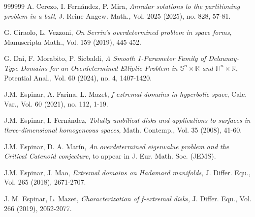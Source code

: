 \documentclass[11pt]{article}
\numberwithin{equation} {section}
\begin{document}
\begin{thebibliography}{999999}
	 A. Cerezo, I. Fernández, P. Mira, \emph{Annular solutions to the partitioning problem in a ball}, J. Reine Angew. Math., Vol. 2025 (2025), no. 828, 57-81.

	
	
	 G. Ciraolo, L. Vezzoni, {\it On Serrin's overdetermined problem in space forms}, Manuscripta Math., Vol. 159 (2019), 445-452. 
	
	 G. Dai, F. Morabito, P. Sicbaldi, \emph{A Smooth 1-Parameter Family of Delaunay-Type Domains for an Overdetermined Elliptic Problem in $\mathbb{S}^n \times \mathbb{R}$ and $\mathbb{H}^n \times \mathbb{R}$}, Potential Anal., Vol. 60 (2024), no. 4, 1407-1420.
	
	
	
	
	 J.M. Espinar, A. Farina, L. Mazet, \emph{f-extremal domains in hyperbolic space}, Calc. Var., Vol. 60 (2021), no. 112, 1-19. 
	
	 J.M. Espinar, I. Fernández, {\it Totally umbilical disks and applications to surfaces in three-dimensional homogeneous spaces}, Math. Contemp., Vol. 35 (2008), 41-60.
	
	 J.M. Espinar, D. A. Mar\'{i}n, \emph{An overdetermined eigenvalue problem and the Critical Catenoid conjecture}, to appear in J. Eur. Math. Soc. (JEMS).
	
	 J.M. Espinar, J. Mao, \emph{Extremal domains on Hadamard manifolds}, J. Differ. Equ., Vol. 265 (2018), 2671-2707.
	
	 J. M. Espinar, L. Mazet, \emph{Characterization of f-extremal disks}, J. Differ. Equ., Vol. 266 (2019), 2052-2077.
	
	

\end{thebibliography}
\end{document}
